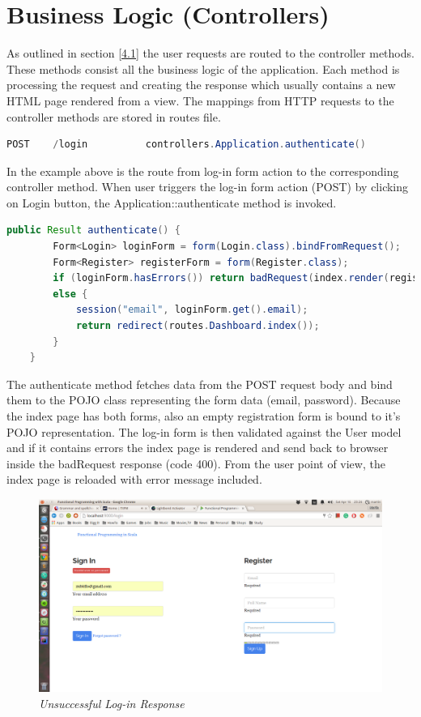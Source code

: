 \documentclass[12pt,twoside,a4paper]{report}
\begin{document}
\section{Business Logic (Controllers)}\label{4.5}
As outlined in section \ref{4.1} the user requests are routed to the controller methods. These methods consist all the business logic of the application. Each method is processing the request and creating the response which usually contains a new HTML page rendered from a view. The mappings from HTTP requests to the controller methods are stored in routes file.

\begin{lstlisting}[language=java]
	POST    /login     		controllers.Application.authenticate()
\end{lstlisting}

In the example above is the route from log-in form action to the corresponding controller method. When user triggers the log-in form action (POST) by clicking on Login button, the Application::authenticate method is invoked.

\begin{lstlisting}[language=java]
	public Result authenticate() {
        Form<Login> loginForm = form(Login.class).bindFromRequest();
        Form<Register> registerForm = form(Register.class);
        if (loginForm.hasErrors()) return badRequest(index.render(registerForm, loginForm));
        else {
            session("email", loginForm.get().email);
            return redirect(routes.Dashboard.index());
        }
    }
\end{lstlisting}

The authenticate method fetches data from the POST request body and bind them to the POJO class representing the form data (email, password). Because the index page has both forms, also an empty registration form is bound to it's POJO representation. The log-in form is then validated against the User model and if it contains errors the index page is rendered and send back to browser inside the badRequest response (code 400). From the user point of view, the index page is reloaded with error message included.

\begin{figure}[!ht]
	\centering
		\includegraphics[width=1\textwidth, totalheight=8cm]
		{invalid_user_or_password_view}
	\caption{\textit{Unsuccessful Log-in Response}}
	\label{f4.5.1}
\end{figure}
\end{document}
